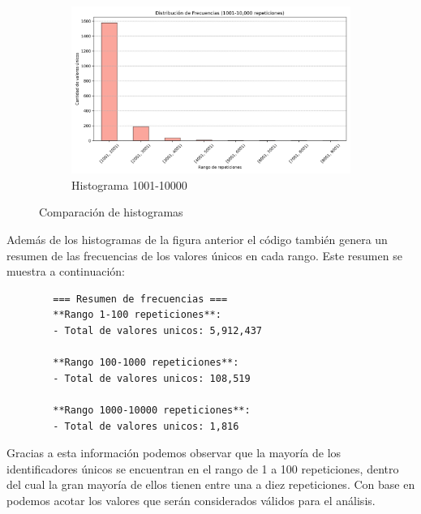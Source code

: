 \begin{figure}[htbp]
    \begin{subfigure}[t]{0.48\textwidth}
        \centering
        \includegraphics[width=\linewidth]{img/histograma_1001_10000.png}
        \caption{Histograma 1001-10000}
        \label{fig:sub3}
    \end{subfigure}

    \caption{Comparación de histogramas}
    \label{fig:histogramas}
\end{figure}

\noindent Además de los histogramas de la figura anterior el código también genera un resumen de las frecuencias de los valores únicos en cada rango. Este resumen se muestra a continuación:

\begin{verbatim}
        === Resumen de frecuencias ===
        **Rango 1-100 repeticiones**:
        - Total de valores unicos: 5,912,437

        **Rango 100-1000 repeticiones**:
        - Total de valores unicos: 108,519

        **Rango 1000-10000 repeticiones**:
        - Total de valores unicos: 1,816
\end{verbatim}

\noindent Gracias a esta información podemos observar que la mayoría de los identificadores únicos se encuentran en el rango de 1 a 100 repeticiones, dentro del cual la gran mayoría de ellos tienen entre una a diez repeticiones. Con base en podemos acotar los valores que serán considerados válidos para el análisis.

